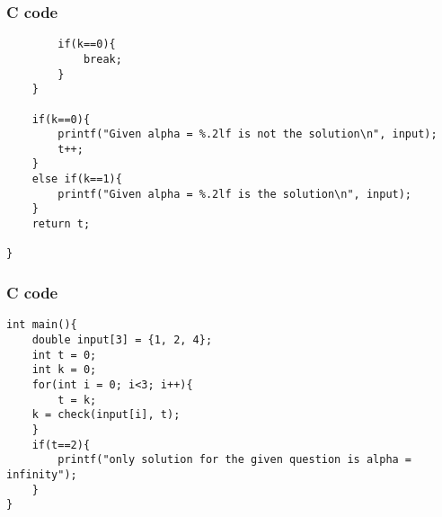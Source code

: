 \documentclass{beamer}
\begin{document}
\begin{frame}[fragile]
    \frametitle{C code}
    \begin{lstlisting}
        if(k==0){
            break;
        }
    }
    
    if(k==0){
        printf("Given alpha = %.2lf is not the solution\n", input);
        t++;
    }
    else if(k==1){
        printf("Given alpha = %.2lf is the solution\n", input);
    }
    return t;

}
    \end{lstlisting}
\end{frame}

\begin{frame}[fragile]
    \frametitle{C code}
    \begin{lstlisting}
int main(){
    double input[3] = {1, 2, 4};
    int t = 0;
    int k = 0;
    for(int i = 0; i<3; i++){
        t = k; 
    k = check(input[i], t);
    }
    if(t==2){
        printf("only solution for the given question is alpha = infinity");
    }
}
    \end{lstlisting}
\end{frame}
\end{document}
